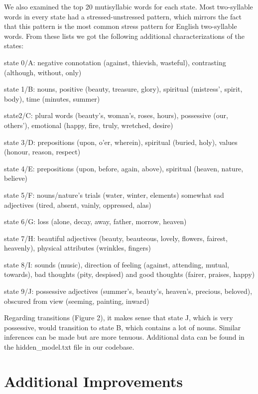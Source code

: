 We also examined the top 20 mutisyllabic words for each state. Most two-syllable words in every state had a stressed-unstressed pattern, which mirrors the fact that this pattern is the most common stress pattern for English two-syllable words. From these lists we got the following additional characterizations of the states:
\begin{compactitem}
\item state 0/A: negative connotation (against, thievish, wasteful), contrasting (although, without, only)
\item state 1/B: nouns, positive (beauty, treasure, glory), spiritual (mistress', spirit, body), time (minutes, summer)
\item state2/C: plural words (beauty's, woman's, roses, hours), possessive (our, others'), emotional (happy, fire, truly, wretched, desire)
\item state 3/D: prepositions (upon, o'er, wherein), spiritual (buried, holy), values (honour, reason, respect)
\item state 4/E: prepositions (upon, before, again, above), spiritual (heaven, nature, believe)
\item state 5/F: nouns/nature's trials (water, winter, elements) somewhat sad adjectives (tired, absent, vainly, oppressed, alas)
\item state 6/G: loss (alone, decay, away, father, morrow, heaven)
\item state 7/H: beautiful adjectives (beauty, beauteous, lovely, flowers, fairest, heavenly), physical attributes (wrinkles, fingers)
\item state 8/I: sounds (music), direction of feeling (against, attending, mutual, towards), bad thoughts (pity, despised) and good thoughts (fairer, praises, happy)
\item state 9/J: possessive adjectives (summer's, beauty's, heaven's, precious, beloved), obscured from view (seeming, painting, inward)
\end{compactitem}

Regarding transitions (Figure 2), it makes sense that state J, which is very possessive, would transition to state B, which contains a lot of nouns. Similar inferences can be made but are more tenuous. Additional data can be found in the hidden_model.txt file in our codebase.

\section{Additional Improvements}
